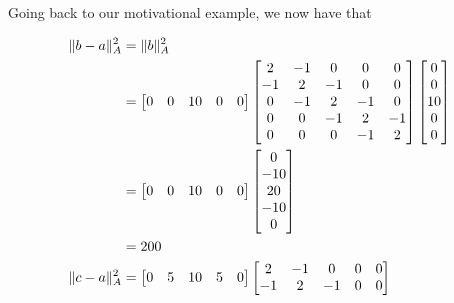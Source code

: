 \documentclass[twoside]{article}
\begin{document}
Going back to our motivational example, we now have that

\begin{align*}
  \|b - a\|^2_A &= \|b\|_A^2 \\
                &=
                  \begin{bmatrix}
                    0 & 0 & 10 & 0 & 0
                  \end{bmatrix}
                  \begin{bmatrix}
                    2 & -1 & 0 & 0 & 0 \\
                    -1 & 2 & -1 & 0 & 0 \\
                    0 & -1 & 2 & -1 & 0 \\
                    0 & 0 & -1 & 2 & -1 \\
                    0 & 0 & 0 & -1 & 2
                  \end{bmatrix}
                  \begin{bmatrix}
                    0 \\
                    0 \\
                    10 \\
                    0 \\
                    0
                  \end{bmatrix} \\
                &=\begin{bmatrix}
                    0 & 0 & 10 & 0 & 0
                  \end{bmatrix}
                  \begin{bmatrix}
                    0 \\
                    -10 \\
                    20 \\
                    -10 \\
                    0
                  \end{bmatrix} \\ \pagebreak[0]
                &= 200 \\
  \|c - a\|^2_A &=
                  \begin{bmatrix}
                    0 & 5 & 10 & 5 & 0
                  \end{bmatrix}
                  \begin{bmatrix}
                    2 & -1 & 0 & 0 & 0 \\
                    -1 & 2 & -1 & 0 & 0 \\

\end{bmatrix}
\end{align*}
\end{document}
